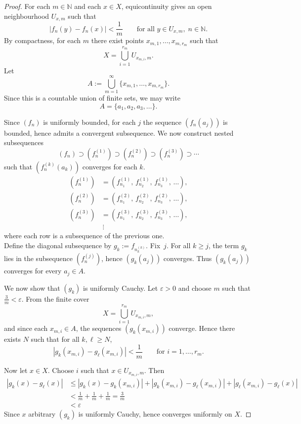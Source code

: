 \documentclass[12pt]{article}
\begin{document}
\begin{proof}
For each $m\in\mathbb{N}$ and each $x\in X$, equicontinuity gives an open neighbourhood
$U_{x,m}$ such that
\[
|f_n(y)-f_n(x)|<\frac1m
\qquad \text{for all } y\in U_{x,m},\; n\in\mathbb{N}.
\]
By compactness, for each $m$ there exist points $x_{m,1},\dots,x_{m,r_m}$ such that
\[
X=\bigcup_{i=1}^{r_m} U_{x_{m,i},m}.
\]
Let
\[
A := \bigcup_{m=1}^\infty \{x_{m,1}, \dots, x_{m,r_m}\}.
\]
Since this is a countable union of finite sets, we may write
\[
A = \{a_1, a_2, a_3, \dots\}.
\]

Since $(f_n)$ is uniformly bounded, for each $j$ the sequence $(f_n(a_j))$ is bounded,
hence admits a convergent subsequence. We now construct nested subsequences
\[
(f_n)\supset (f_n^{(1)})\supset (f_n^{(2)})\supset (f_n^{(3)})\supset \cdots
\]
such that $(f_n^{(k)}(a_k))$ converges for each $k$.
\[
\begin{aligned}
(f_n^{(1)}) &= (f_{n_1}^{(1)},\, f_{n_2}^{(1)},\, f_{n_3}^{(1)},\, \dots), \\
(f_n^{(2)}) &= (f_{n_1}^{(2)},\, f_{n_2}^{(2)},\, f_{n_3}^{(2)},\, \dots), \\
(f_n^{(3)}) &= (f_{n_1}^{(3)},\, f_{n_2}^{(3)},\, f_{n_3}^{(3)},\, \dots), \\
&\ \vdots
\end{aligned}
\]
where each row is a subsequence of the previous one. \\

Define the diagonal subsequence by $g_k := f_{n_k^{(k)}}.$ Fix~$j$. For all $k\ge j$, the term $g_k$ lies in the subsequence $(f_n^{(j)})$,
hence $(g_k(a_j))$ converges. Thus $(g_k(a_j))$ converges for every $a_j\in A$.

We now show that $(g_k)$ is uniformly Cauchy. Let $\varepsilon>0$ and choose $m$ such that $\frac{3}{m}<\varepsilon.$
From the finite cover
\[
X=\bigcup_{i=1}^{r_m} U_{x_{m,i},m},
\]
and since each $x_{m,i}\in A$, the sequences $(g_k(x_{m,i}))$ converge. Hence there exists $N$
such that for all $k,\ell\ge N$,
\[
|g_k(x_{m,i})-g_\ell(x_{m,i})|<\frac1m
\qquad \text{for } i=1,\dots,r_m.
\]

Now let $x\in X$. Choose $i$ such that $x\in U_{x_{m,i},m}$. Then
\[
\begin{aligned}
|g_k(x)-g_\ell(x)| 
&\le |g_k(x)-g_k(x_{m,i})| + |g_k(x_{m,i})-g_\ell(x_{m,i})| + |g_\ell(x_{m,i})-g_\ell(x)| \\
&< \frac1m+\frac1m+\frac1m = \frac{3}{m} \\
&< \varepsilon
\end{aligned}
\]
Since $x$ arbitrary $(g_k)$ is uniformly Cauchy, hence converges uniformly on $X$.
\end{proof}
\end{document}
